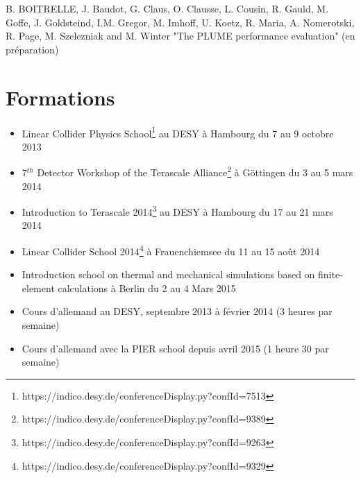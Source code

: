 \documentclass[a4papper, 10pt]{article}
\begin{document}
  B. BOITRELLE, J. Baudot, G. Claus, O. Clausse, L. Cousin, R. Gauld, M. Goffe, J. Goldsteind, I.M. Gregor, M. Imhoff, U. Koetz, R. Maria, A. Nomerotski, R. Page, M. Szelezniak and M. Winter "The PLUME performance evaluation" (en préparation)

  \section*{Formations}
 
  \begin{itemize}
    \item Linear Collider Physics School\footnote{https://indico.desy.de/conferenceDisplay.py?confId=7513} au DESY à Hambourg du 7 au 9 octobre 2013
    \item 7$^{th}$ Detector Workshop of the Terascale Alliance\footnote{https://indico.desy.de/conferenceDisplay.py?confId=9389} à Göttingen du 3 au 5 mars 2014
    \item Introduction to Terascale 2014\footnote{https://indico.desy.de/conferenceDisplay.py?confId=9263} au DESY à Hambourg du 17 au 21 mars 2014
    \item Linear Collider School 2014\footnote{https://indico.desy.de/conferenceDisplay.py?confId=9329} à Frauenchiemsee du 11 au 15 août 2014
    \item Introduction school on thermal and mechanical simulations based on finite-element calculations à Berlin du 2 au 4 Mars 2015
    \item Cours d'allemand au DESY, septembre 2013 à février 2014 (3 heures par semaine)
    \item Cours d'allemand avec la PIER school depuis avril 2015 (1 heure 30 par semaine)
  \end{itemize}

 
\end{document}
